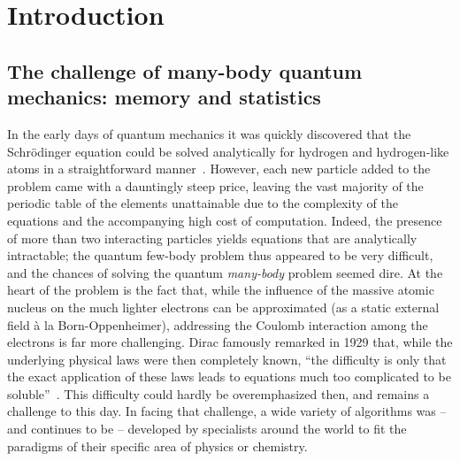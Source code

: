 \documentclass[../main.tex]{subfiles}
\begin{document}
\section{\label{sect:intro}Introduction}

\subsection{The challenge of many-body quantum mechanics: memory and statistics}

In the early days of quantum mechanics it was quickly discovered that the Schr\"odinger equation could be solved analytically for hydrogen and hydrogen-like atoms in a straightforward manner~\cite{BetheSalpeterBook}. However, each new particle added to the problem came with a dauntingly steep price, leaving the vast majority of the periodic table of the elements unattainable due to the complexity of the equations and the accompanying high cost of computation. Indeed, the presence of more than two interacting particles yields equations that are analytically intractable; the quantum few-body problem thus appeared to be very difficult, and the chances of solving the quantum {\it many-body} problem seemed dire. At the heart of the problem is the fact that, while the influence of the massive atomic nucleus on the much lighter electrons can be approximated (as a static external field \`a la Born-Oppenheimer), addressing the Coulomb interaction among the electrons is far more challenging. Dirac famously remarked in 1929 that, while the underlying physical laws were then completely known, ``the difficulty is only that the exact application of these laws leads to equations much too complicated to be soluble''~\cite{DiracQuote}. This difficulty could hardly be overemphasized then, and remains a challenge to this day. In facing that challenge, a wide variety of algorithms was -- and continues to be -- developed by specialists around the world to fit the paradigms of their specific area of physics or chemistry.
\end{document}
